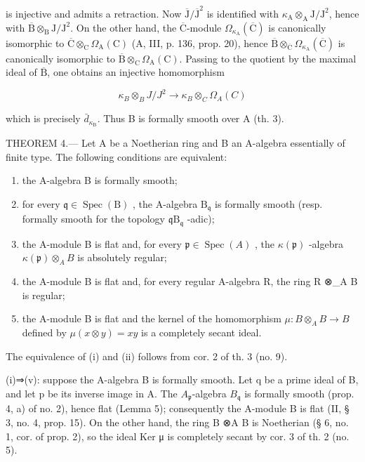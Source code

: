 is injective and admits a retraction. Now \(\overline{\mathrm{J}}/\overline{\mathrm{J}}^{2}\) is identified with \(\kappa_{\mathrm{A}}\otimes_{\mathrm{A}}\mathrm{J}/\mathrm{J}^{2}\), hence with \(\overline{\mathrm{B}}\otimes_{\mathrm{B}}\mathrm{J}/\mathrm{J}^{2}\). On the other hand, the \(\overline{\mathrm{C}}\)-module \(\Omega_{\kappa_{\mathrm{A}}}(\overline{\mathrm{C}})\) is canonically isomorphic to \(\overline{\mathrm{C}}\otimes_{\mathrm{C}}\Omega_{\mathrm{A}}(\mathrm{C})\) (A, III, p. 136, prop. 20), hence \(\overline{\mathrm{B}}\otimes_{\overline{\mathrm{C}}}\Omega_{\kappa_{\mathrm{A}}}(\overline{\mathrm{C}})\) is canonically isomorphic to \(\overline{\mathrm{B}}\otimes_{\mathrm{C}}\Omega_{\mathrm{A}}(\mathrm{C})\). Passing to the quotient by the maximal ideal of \(\overline{\mathrm{B}}\), one obtains an injective homomorphism

\[
\kappa_ {B} \otimes_ {B} J / J ^ {2} \longrightarrow \kappa_ {B} \otimes_ {C} \Omega_ {A} (C)
\]

which is precisely \(\bar{d}_{\kappa_{\mathrm{B}}}\). Thus B is formally smooth over A (th. 3).

THEOREM 4.--- Let A be a Noetherian ring and B an A-algebra essentially of finite type. The following conditions are equivalent:

\begin{enumerate}
\def\labelenumi{(\roman{enumi})}
\item
  the A-algebra B is formally smooth;
\item
  for every \(\mathfrak{q} \in \operatorname{Spec}(\mathrm{B})\) , the A-algebra \(\mathrm{B}_{\mathfrak{q}}\) is formally smooth (resp. formally smooth for the topology \(\mathfrak{q}\mathrm{B}_{\mathfrak{q}}\) -adic);
\item
  the A-module B is flat and, for every \(\mathfrak{p} \in \operatorname{Spec}(A)\) , the \(\kappa(\mathfrak{p})\) -algebra \(\kappa(\mathfrak{p}) \otimes_{A} B\) is absolutely regular;
\item
  the A-module B is flat and, for every regular A-algebra R, the ring R ⊗\_A B is regular;
\item
  the A-module B is flat and the kernel of the homomorphism \(\mu:B\otimes_{A}B\to B\) defined by \(\mu(x\otimes y)=xy\) is a completely secant ideal.
\end{enumerate}

The equivalence of (i) and (ii) follows from cor. 2 of th. 3 (no. 9).

(i)⇒(v): suppose the A-algebra B is formally smooth. Let q be a prime ideal of B, and let p be its inverse image in A. The \(A_{\mathfrak{p}}\)-algebra \(B_{\mathfrak{q}}\) is formally smooth (prop. 4, a) of no. 2), hence flat (Lemma 5); consequently the A-module B is flat (II, § 3, no. 4, prop. 15). On the other hand, the ring B ⊗A B is Noetherian (§ 6, no. 1, cor. of prop. 2), so the ideal Ker μ is completely secant by cor. 3 of th. 2 (no. 5).

